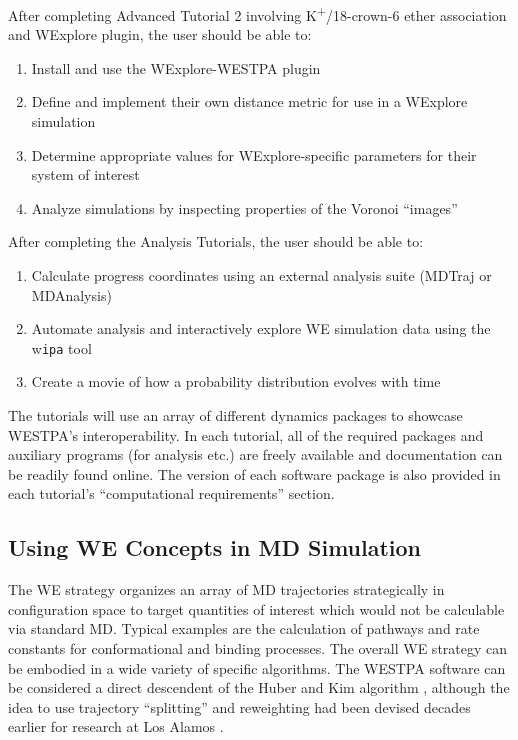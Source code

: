 \documentclass[9pt,tutorial,pubversion]{livecoms}
\begin{document}
After completing Advanced Tutorial 2 involving K\textsuperscript{+}/18-crown-6 ether association and WExplore plugin, the user should be able to:
\begin{enumerate}
\item Install and use the WExplore-WESTPA plugin
\item Define and implement their own distance metric for use in a WExplore simulation
\item Determine appropriate values for WExplore-specific parameters for their system of interest
\item Analyze simulations by inspecting properties of the Voronoi “images” 
\end{enumerate}

After completing the Analysis Tutorials, the user should be able to:
\begin{enumerate}
\item Calculate progress coordinates using an external analysis suite (MDTraj or MDAnalysis)
\item Automate analysis and interactively explore WE simulation data using the w\textunderscore \verb|ipa| tool
\item Create a movie of how a probability distribution evolves with time
\end{enumerate}

The tutorials will use an array of different dynamics packages to showcase WESTPA’s interoperability. In each tutorial, all of the required packages and auxiliary programs (for analysis etc.) are freely available and documentation can be readily found online.  The version of each software package is also provided in each tutorial’s “computational requirements” section. 

\subsection{Using WE Concepts in MD Simulation}

The WE strategy organizes an array of MD trajectories strategically in configuration space to target quantities of interest which would not be calculable via standard MD. 
Typical examples are the calculation of pathways and rate constants for conformational and binding processes. 
The overall WE strategy can be embodied in a wide variety of specific algorithms. 
The WESTPA software can be considered a direct descendent of the Huber and Kim algorithm \citep{HuberKim1996}, although the idea to use trajectory “splitting” and reweighting had been devised decades earlier for research at Los Alamos \citep{KahnHarris1951}.  
\end{document}
